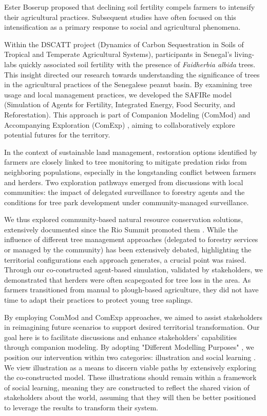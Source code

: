 \documentclass{article}
\begin{document}
Ester Boserup \parencite{boserup_conditions_1965} proposed that declining soil fertility compels farmers to intensify their agricultural practices. Subsequent studies have often focused on this intensification as a primary response to social and agricultural phenomena.

Within the DSCATT project (Dynamics of Carbon Sequestration in Soils of Tropical and Temperate Agricultural Systems), participants in Senegal's living-labs quickly associated soil fertility with the presence of \textit{Faidherbia albida} trees. This insight directed our research towards understanding the significance of trees in the agricultural practices of the Senegalese peanut basin. By examining tree usage and local management practices, we developed the SAFIRe model (Simulation of Agents for Fertility, Integrated Energy, Food Security, and Reforestation). This approach is part of Companion Modeling (ComMod) \parencite{etienne_companion_2014, barreteau_our_2003} and Accompanying Exploration (ComExp) \parencite{delay_comexp_2020}, aiming to collaboratively explore potential futures for the territory.

In the context of sustainable land management, restoration options identified by farmers are closely linked to tree monitoring to mitigate predation risks from neighboring populations, especially in the longstanding conflict between farmers and herders. Two exploration pathways emerged from discussions with local communities: the impact of delegated surveillance to forestry agents and the conditions for tree park development under community-managed surveillance.

We thus explored community-based natural resource conservation solutions, extensively documented since the Rio Summit promoted them \parencite{selfa_politics_2008, maraseni_assessment_2019, he_community_2020}. While the influence of different tree management approaches (delegated to forestry services or managed by the community) has been extensively debated, highlighting the territorial configurations each approach generates, a crucial point was raised. Through our co-constructed agent-based simulation, validated by stakeholders, we demonstrated that herders were often scapegoated for tree loss in the area. As farmers transitioned from manual to plough-based agriculture, they did not have time to adapt their practices to protect young tree saplings.

By employing ComMod and ComExp approaches, we aimed to assist stakeholders in reimagining future scenarios \parencite{jansujwicz_localism_2021} to support desired territorial transformation. Our goal here is to facilitate discussions and enhance stakeholders' capabilities through companion modeling. By adopting "Different Modelling Purposes" \parencite{edmonds_different_2019}, we position our intervention within two categories: illustration and social learning \parencite{sukthankar_kilt_2017}. We view illustration as a means to discern viable paths by extensively exploring the co-constructed model. These illustrations should remain within a framework of social learning, meaning they are constructed to reflect the shared vision of stakeholders about the world, assuming that they will then be better positioned to leverage the results to transform their system.
\end{document}
